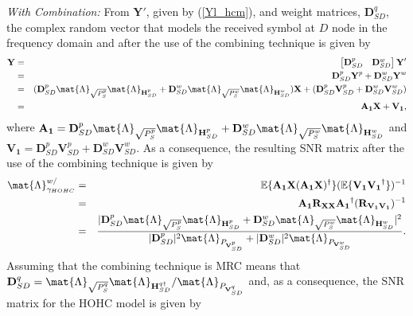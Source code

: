 \textit{With Combination:} From $\mathbf{Y'}$, given by (\ref{Yl_hcm}), and weight matrices, $ \mathbf{D}_{SD}^q $, the complex random vector that models the received symbol at $D$ node in the frequency domain and after the use of the combining technique is given by
\begin{eqnarray}
	\mathbf{Y} & = &  \begin{bmatrix} \mathbf{D}_{SD}^{p} & \mathbf{D}_{SD}^{w} \end{bmatrix} \mathbf{Y'} \nonumber\\
	& = &  \mathbf{D}_{SD}^{p} \mathbf{Y}^{p}  + \mathbf{D}_{SD}^{w} \mathbf{Y}^{w} \nonumber\\
	& = &  (\mathbf{D}_{SD}^{p} \mat{\Lambda}_{\sqrt{P_{S}^{p}}} \mat{\Lambda}_{\mathbf{H}_{SD}^p} + \mathbf{D}_{SD}^{w} \mat{\Lambda}_{\sqrt{P_{S}^{w}}} \mat{\Lambda}_{\mathbf{H}_{SD}^w}) \mathbf{X}+ (\mathbf{D}_{SD}^{p} \mathbf{V}_{SD}^{p} + \mathbf{D}_{SD}^{w} \mathbf{V}_{SD}^{w})\nonumber\\
& = &  \mathbf{A_1} \mathbf{X}+ \mathbf{V_1},
\end{eqnarray}
where $ \mathbf{A_1} = \mathbf{D}_{SD}^{p} \mat{\Lambda}_{\sqrt{P_{S}^{p}}} \mat{\Lambda}_{\mathbf{H}_{SD}^p} + \mathbf{D}_{SD}^{w} \mat{\Lambda}_{\sqrt{P_{S}^{w}}} \mat{\Lambda}_{\mathbf{H}_{SD}^w} $ and $ \mathbf{V_1} = \mathbf{D}_{SD}^{p}\mathbf{V}_{SD}^{p} + \mathbf{D}_{SD}^{w} \mathbf{V}_{SD}^{w} $. As a consequence, the resulting \ac{SNR} matrix after the use of the combining technique is given by
\begin{eqnarray}
	\mat{\Lambda}_{\gamma_{HOHC}}^{w/} & = & \mathbb{E}\{\mathbf{A_1}\mathbf{X}(\mathbf{A_1}\mathbf{X})^\dagger\}(\mathbb{E}\{\mathbf{V_1}\mathbf{V_1}^\dagger\})^{-1} \nonumber\\
	& = & \mathbf{A_1} \mathbf{R}_{\mathbf{X}\mathbf{X}} \mathbf{A_1}^\dagger (\mathbf{R}_{\mathbf{V_1}\mathbf{V_1}})^{-1} \nonumber\\
	& = & \frac{|\mathbf{D}_{SD}^{p} \mat{\Lambda}_{\sqrt{P_{S}^{p}}} \mat{\Lambda}_{\mathbf{H}_{SD}^p} + \mathbf{D}_{SD}^{w} \mat{\Lambda}_{\sqrt{P_{S}^{w}}} \mat{\Lambda}_{\mathbf{H}_{SD}^w}|^2}
{|\mathbf{D}_{SD}^{p}|^2 \mat{\Lambda}_{P_{\mathbf{V}_{SD}^p}} + |\mathbf{D}_{SD}^{w}|^2 \mat{\Lambda}_{P_{\mathbf{V}_{SD}^w}}}.
\end{eqnarray}
Assuming that the combining technique is \ac{MRC} means that $\mathbf{D}_{SD}^q = \mat{\Lambda}_{\sqrt{P_{S}^{q}}} \mat{\Lambda}_{\mathbf{H}_{SD}^{q \dagger}} / \mat{\Lambda}_{P_{\mathbf{V}_{SD}^q}} $ and, as a consequence, the \ac{SNR} matrix for the \ac{HOHC} model is given by

